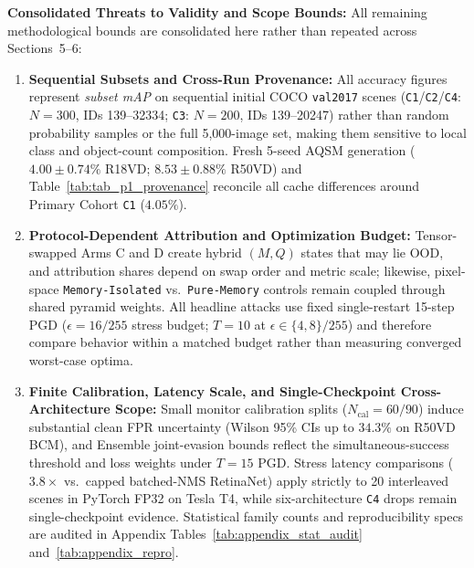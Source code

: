 \documentclass[preprint,10pt]{elsarticle}
\begin{document}
\noindent\textbf{Consolidated Threats to Validity and Scope Bounds:} All remaining methodological bounds are consolidated here rather than repeated across Sections~5--6:
\begin{enumerate}
    \item \textbf{Sequential Subsets and Cross-Run Provenance:} All accuracy figures represent \textit{subset mAP} on sequential initial COCO \texttt{val2017} scenes (\texttt{C1}/\texttt{C2}/\texttt{C4}: $N = 300$, IDs 139--32334; \texttt{C3}: $N = 200$, IDs 139--20247) rather than random probability samples or the full 5,000-image set, making them sensitive to local class and object-count composition. Fresh 5-seed AQSM generation ($4.00 \pm 0.74\%$ R18VD; $8.53 \pm 0.88\%$ R50VD) and Table~\ref{tab:tab_p1_provenance} reconcile all cache differences around Primary Cohort \texttt{C1} ($4.05\%$).
    \item \textbf{Protocol-Dependent Attribution and Optimization Budget:} Tensor-swapped Arms C and D create hybrid $(M, Q)$ states that may lie OOD, and attribution shares depend on swap order and metric scale; likewise, pixel-space \texttt{Memory-Isolated} vs.\ \texttt{Pure-Memory} controls remain coupled through shared pyramid weights. All headline attacks use fixed single-restart 15-step PGD ($\epsilon = 16/255$ stress budget; $T = 10$ at $\epsilon \in \{4, 8\}/255$) and therefore compare behavior within a matched budget rather than measuring converged worst-case optima.
    \item \textbf{Finite Calibration, Latency Scale, and Single-Checkpoint Cross-Architecture Scope:} Small monitor calibration splits ($N_{\mathrm{cal}}=60/90$) induce substantial clean FPR uncertainty (Wilson 95\% CIs up to $34.3\%$ on R50VD BCM), and Ensemble joint-evasion bounds reflect the simultaneous-success threshold and loss weights under $T=15$ PGD. Stress latency comparisons ($3.8\times$ vs.\ capped batched-NMS RetinaNet) apply strictly to 20 interleaved scenes in PyTorch FP32 on Tesla T4, while six-architecture \texttt{C4} drops remain single-checkpoint evidence. Statistical family counts and reproducibility specs are audited in Appendix Tables~\ref{tab:appendix_stat_audit} and~\ref{tab:appendix_repro}.
\end{enumerate}
\end{document}
